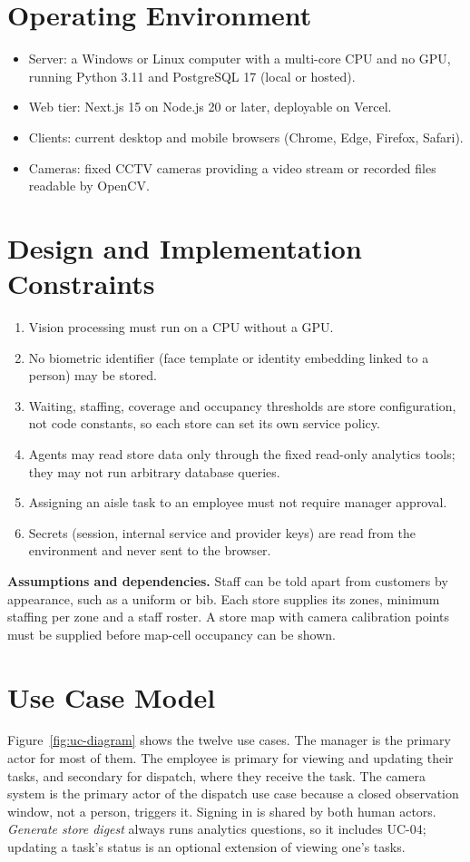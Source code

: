 \section{Operating Environment}
\begin{itemize}
\item Server: a Windows or Linux computer with a multi-core CPU and no GPU, running Python 3.11 and PostgreSQL 17 (local or hosted).
\item Web tier: Next.js 15 on Node.js 20 or later, deployable on Vercel.
\item Clients: current desktop and mobile browsers (Chrome, Edge, Firefox, Safari).
\item Cameras: fixed CCTV cameras providing a video stream or recorded files readable by OpenCV.
\end{itemize}

\section{Design and Implementation Constraints}
\label{sec:srs-constraints}
\begin{enumerate}[label=C\arabic*.]
\item Vision processing must run on a CPU without a GPU.
\item No biometric identifier (face template or identity embedding linked to a person) may be stored.
\item Waiting, staffing, coverage and occupancy thresholds are store configuration, not code constants, so each store can set its own service policy.
\item Agents may read store data only through the fixed read-only analytics tools; they may not run arbitrary database queries.
\item Assigning an aisle task to an employee must not require manager approval.
\item Secrets (session, internal service and provider keys) are read from the environment and never sent to the browser.
\end{enumerate}

\textbf{Assumptions and dependencies.} Staff can be told apart from customers by appearance, such as a uniform or bib. Each store supplies its zones, minimum staffing per zone and a staff roster. A store map with camera calibration points must be supplied before map-cell occupancy can be shown.

\section{Use Case Model}
\label{sec:uc-model}
Figure~\ref{fig:uc-diagram} shows the twelve use cases. The manager is the primary actor for most of them. The employee is primary for viewing and updating their tasks, and secondary for dispatch, where they receive the task. The camera system is the primary actor of the dispatch use case because a closed observation window, not a person, triggers it. Signing in is shared by both human actors. \emph{Generate store digest} always runs analytics questions, so it includes UC-04; updating a task's status is an optional extension of viewing one's tasks.

